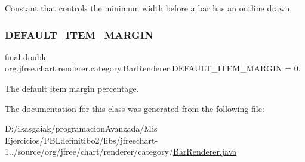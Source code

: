Constant that controls the minimum width before a bar has an outline drawn. \mbox{\label{classorg_1_1jfree_1_1chart_1_1renderer_1_1category_1_1_bar_renderer_aa61e0688317d2f77eee86eeeb75ed0f9}} 
\subsubsection{\texorpdfstring{D\+E\+F\+A\+U\+L\+T\+\_\+\+I\+T\+E\+M\+\_\+\+M\+A\+R\+G\+IN}{DEFAULT\_ITEM\_MARGIN}}
{\footnotesize\ttfamily final double org.\+jfree.\+chart.\+renderer.\+category.\+Bar\+Renderer.\+D\+E\+F\+A\+U\+L\+T\+\_\+\+I\+T\+E\+M\+\_\+\+M\+A\+R\+G\+IN = 0.\hspace{0.3cm}{\ttfamily [static]}}

The default item margin percentage. 

The documentation for this class was generated from the following file\+:\begin{DoxyCompactItemize}
\item 
D\+:/ikasgaiak/programacion\+Avanzada/\+Mis Ejercicios/\+P\+B\+Ldefinitibo2/libs/jfreechart-\/1../source/org/jfree/chart/renderer/category/\mbox{\hyperlink{_bar_renderer_8java}{Bar\+Renderer.\+java}}\end{DoxyCompactItemize}
